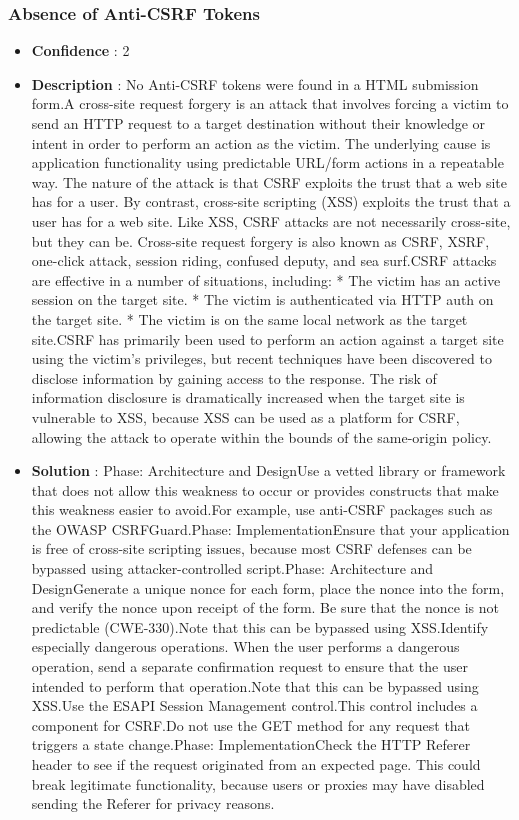 \documentclass[10pt]{article}
\begin{document}
\subsubsection{Absence of Anti-CSRF Tokens}
\begin{itemize}
\item[] \textbf{Confidence} : 2
\item[] \textbf{Description} : No Anti-CSRF tokens were found in a HTML submission form.A cross-site request forgery is an attack that involves forcing a victim to send an HTTP request to a target destination without their knowledge or intent in order to perform an action as the victim. The underlying cause is application functionality using predictable URL/form actions in a repeatable way. The nature of the attack is that CSRF exploits the trust that a web site has for a user. By contrast, cross-site scripting (XSS) exploits the trust that a user has for a web site. Like XSS, CSRF attacks are not necessarily cross-site, but they can be. Cross-site request forgery is also known as CSRF, XSRF, one-click attack, session riding, confused deputy, and sea surf.CSRF attacks are effective in a number of situations, including:    * The victim has an active session on the target site.    * The victim is authenticated via HTTP auth on the target site.    * The victim is on the same local network as the target site.CSRF has primarily been used to perform an action against a target site using the victim's privileges, but recent techniques have been discovered to disclose information by gaining access to the response. The risk of information disclosure is dramatically increased when the target site is vulnerable to XSS, because XSS can be used as a platform for CSRF, allowing the attack to operate within the bounds of the same-origin policy.
\item[] \textbf{Solution} :  Phase: Architecture and DesignUse a vetted library or framework that does not allow this weakness to occur or provides constructs that make this weakness easier to avoid.For example, use anti-CSRF packages such as the OWASP CSRFGuard.Phase: ImplementationEnsure that your application is free of cross-site scripting issues, because most CSRF defenses can be bypassed using attacker-controlled script.Phase: Architecture and DesignGenerate a unique nonce for each form, place the nonce into the form, and verify the nonce upon receipt of the form. Be sure that the nonce is not predictable (CWE-330).Note that this can be bypassed using XSS.Identify especially dangerous operations. When the user performs a dangerous operation, send a separate confirmation request to ensure that the user intended to perform that operation.Note that this can be bypassed using XSS.Use the ESAPI Session Management control.This control includes a component for CSRF.Do not use the GET method for any request that triggers a state change.Phase: ImplementationCheck the HTTP Referer header to see if the request originated from an expected page. This could break legitimate functionality, because users or proxies may have disabled sending the Referer for privacy reasons.

\end{itemize}
\end{document}
